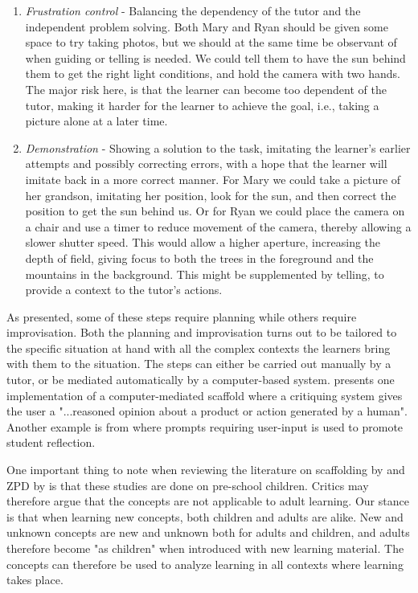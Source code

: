 \begin{enumerate}
\item{} \emph{Frustration control} - Balancing the dependency of the tutor and the independent problem solving. Both Mary and Ryan should be given some space to try taking photos, but we should at the same time be observant of when guiding or telling is needed. We could tell them to have the sun behind them to get the right light conditions, and hold the camera with two hands. The major risk here, is that the learner can become too dependent of the tutor, making it harder for the learner to achieve the goal, i.e., taking a picture alone at a later time.  

\item{}  \emph{Demonstration} - Showing a solution to the task, imitating the learner's earlier attempts and possibly correcting errors, with a hope that the learner will imitate back in a more correct manner. For Mary we could take a picture of her grandson, imitating her position, look for the sun, and then correct the position to get the sun behind us. Or for Ryan we could place the camera on a chair and use a timer to reduce movement of the camera, thereby allowing a slower shutter speed. This would allow a higher aperture, increasing the depth of field, giving focus to both the trees in the foreground and the mountains in the background. This might be supplemented by telling, to provide a context to the tutor's actions.
\end{enumerate}

As presented, some of these steps require planning while others require improvisation. Both the planning and improvisation turns out to be tailored to the specific situation at hand with all the complex contexts the learners bring with them to the situation. The steps can either be carried out manually by a tutor, or be mediated automatically by a computer-based system. \citet[p. 1]{fischer1991critics} presents one implementation of a computer-mediated scaffold where a critiquing system gives the user a "...reasoned opinion about a product or action generated by a human". Another example is from \citet{furberg2009socio} where prompts requiring user-input is used to promote student reflection. 

One important thing to note when reviewing the literature on scaffolding by \citet{wood1976role} and ZPD by \citet{vygotskiui1978mind} is that these studies are done on pre-school children. Critics may therefore argue that the concepts are not applicable to adult learning. Our stance is that when learning new concepts, both children and adults are alike. New and unknown concepts are new and unknown both for adults and children, and adults therefore become "as children" when introduced with new learning material. The concepts can therefore be used to analyze learning in all contexts where learning takes place. 

